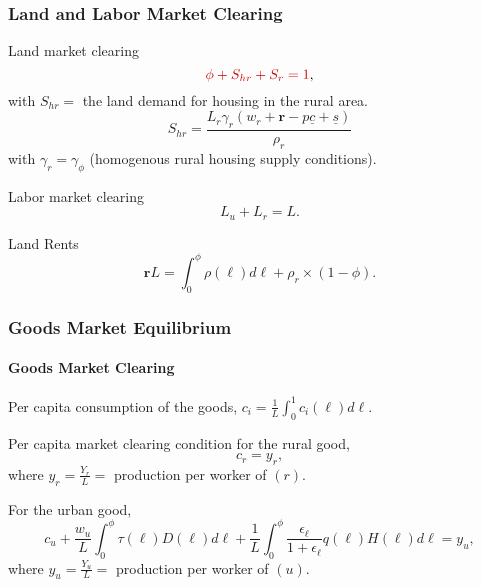 \documentclass[aspectratio=169]{beamer}
\begin{document}
\begin{frame}
\frametitle{Land and Labor Market Clearing}
\bi
\item Land market clearing
 \begin{equation*}
 \re{\phi+S_{hr}+S_r =1},
 \end{equation*}
with $S_{hr}=$ the land demand for housing in the rural area.
\begin{equation*}
S_{hr}=\frac{L_r \gamma_r \left( w_r+\mathbf{r}-p\underline{c} +\underline{s}\right)}{ \rho_r}
 \end{equation*}
with $\gamma_r=\gamma_\phi$ (homogenous rural housing supply conditions).
 \item Labor market clearing
  \begin{equation*}
 L_u+L_r=L.
 \end{equation*}
 \item Land Rents
  \begin{equation}
 \mathbf{r} L=\int_{0}^{\phi}\rho(\ell)d\ell+\rho_r \times (1-\phi). \label{eq:landrents}
 \end{equation}
 \ei
\end{frame}

\begin{v75mins}

\begin{frame}
\frametitle{Goods Market Equilibrium}
\framesubtitle{Goods Market Clearing}
\bi
\item Per capita consumption of the goods, $c_i=\frac{1}{L}\int_{0}^{1}c_i(\ell)d\ell$.
\item Per capita market clearing condition for the rural good,
\begin{equation*}
c_r=y_r,
\end{equation*}
where $y_r=\frac{Y_r}{L}=$ production per worker of $(r)$.
\item For the urban good,
\begin{equation*}
c_u+\frac{w_u}{L}\int_{0}^{\phi}\tau(\ell)D(\ell)d\ell+\frac{1}{L}\int_{0}^{\phi} \frac{\epsilon_{\ell}}{1+\epsilon_{\ell}}q(\ell)H(\ell)d\ell=y_u,
\end{equation*}
where $y_u=\frac{Y_u}{L}=$ production per worker of $(u)$.
\ei
\end{frame}\end{v75mins}
\end{document}
